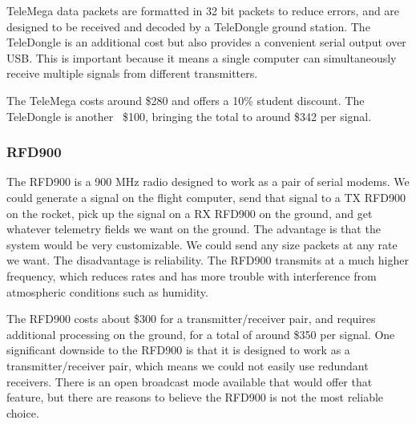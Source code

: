 \documentclass[onecolumn, draftclsnofoot, 10pt, compsoc]{IEEEtran}
\begin{document}
TeleMega data packets are formatted in 32 bit packets to reduce errors, and are designed to be received and decoded by a TeleDongle ground station.  The TeleDongle is an additional cost but also provides a convenient serial output over USB.  This is important because it means a single computer can simultaneously receive multiple signals from different transmitters.

The TeleMega costs around \$280 and offers a 10\% student discount.  The TeleDongle is another ~\$100, bringing the total to around \$342 per signal.

\subsubsection{RFD900}
The RFD900 is a 900 MHz radio designed to work as a pair of serial modems.  We could generate a signal on the flight computer, send that signal to a TX RFD900 on the rocket, pick up the signal on a RX RFD900 on the ground, and get whatever telemetry fields we want on the ground.  The advantage is that the system would be very customizable.  We could send any size packets at any rate we want.  The disadvantage is reliability.  The RFD900 transmits at a much higher frequency, which reduces rates and has more trouble with interference from atmospheric conditions such as humidity.\cite{1}

The RFD900 costs about \$300 for a transmitter/receiver pair, and requires additional processing on the ground, for a total of around \$350 per signal.  One significant downside to the RFD900 is that it is designed to work as a transmitter/receiver pair, which means we could not easily use redundant receivers.  There is an open broadcast mode available that would offer that feature, but there are reasons to believe the RFD900 is not the most reliable choice.
\end{document}
